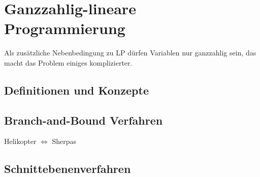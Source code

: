 \section{Ganzzahlig-lineare Programmierung }
  Als zusätzliche Nebenbedingung zu LP dürfen Variablen nur ganzzahlig sein, das macht das Problem
  einiges komplizierter.
  
\subsection{Definitionen und Konzepte }

\subsection{Branch-and-Bound Verfahren }  
  Helikopter $\Leftrightarrow$ Sherpas
  
\subsection{Schnittebenenverfahren }  